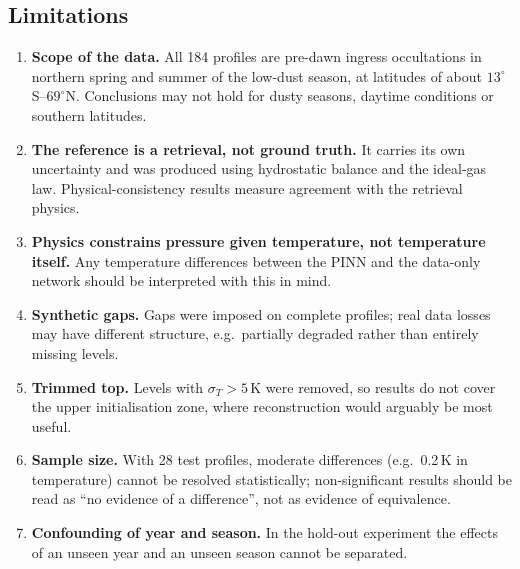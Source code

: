 \documentclass[11pt,a4paper]{article}
\begin{document}
\subsection{Limitations}
\begin{enumerate}[leftmargin=*]
\item \textbf{Scope of the data.} All 184 profiles are pre-dawn ingress occultations in northern spring and summer of the low-dust season, at latitudes of about $13^\circ$S--$69^\circ$N. Conclusions may not hold for dusty seasons, daytime conditions or southern latitudes.
\item \textbf{The reference is a retrieval, not ground truth.} It carries its own uncertainty and was produced using hydrostatic balance and the ideal-gas law. Physical-consistency results measure agreement with the retrieval physics.
\item \textbf{Physics constrains pressure given temperature, not temperature itself.} Any temperature differences between the PINN and the data-only network should be interpreted with this in mind.
\item \textbf{Synthetic gaps.} Gaps were imposed on complete profiles; real data losses may have different structure, e.g.\ partially degraded rather than entirely missing levels.
\item \textbf{Trimmed top.} Levels with $\sigma_T>5$\,K were removed, so results do not cover the upper initialisation zone, where reconstruction would arguably be most useful.
\item \textbf{Sample size.} With 28 test profiles, moderate differences (e.g.\ 0.2\,K in temperature) cannot be resolved statistically; non-significant results should be read as ``no evidence of a difference'', not as evidence of equivalence.
\item \textbf{Confounding of year and season.} In the hold-out experiment the effects of an unseen year and an unseen season cannot be separated.
\end{enumerate}

\end{document}
